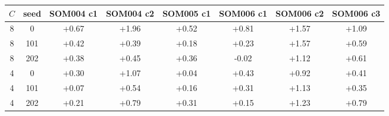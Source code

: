 \begin{tabular}{@{}cc cccccc@{}}\toprule
$C$ & seed & SOM004 c1 & SOM004 c2 & SOM005 c1 & SOM006 c1 & SOM006 c2 & SOM006 c3\\\midrule
8 & 0 & +0.67 & +1.96 & +0.52 & +0.81 & +1.57 & +1.09\\
8 & 101 & +0.42 & +0.39 & +0.18 & +0.23 & +1.57 & +0.59\\
8 & 202 & +0.38 & +0.45 & +0.36 & -0.02 & +1.12 & +0.61\\
4 & 0 & +0.30 & +1.07 & +0.04 & +0.43 & +0.92 & +0.41\\
4 & 101 & +0.07 & +0.54 & +0.16 & +0.31 & +1.13 & +0.35\\
4 & 202 & +0.21 & +0.79 & +0.31 & +0.15 & +1.23 & +0.79\\
\bottomrule\end{tabular}
